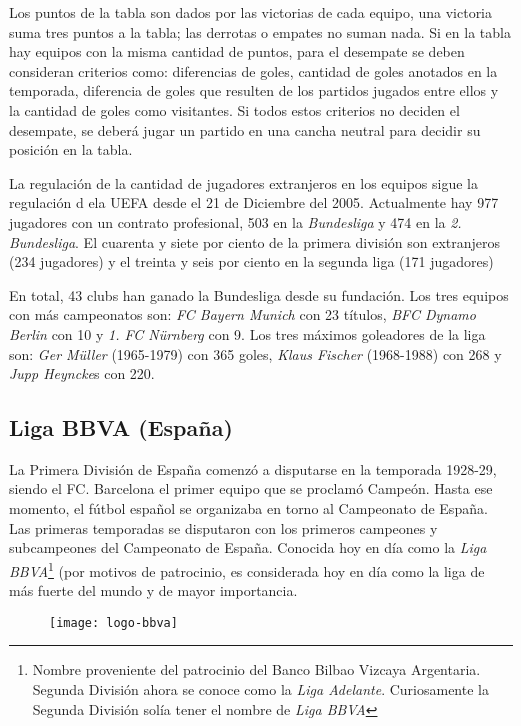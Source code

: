 Los puntos de la tabla son dados por las victorias de cada equipo, una victoria suma tres puntos a la tabla; las derrotas o empates no suman nada. Si en la tabla hay equipos con la misma cantidad de puntos, para el desempate se deben consideran criterios como: diferencias de goles, cantidad de goles anotados en la temporada,  diferencia de goles que resulten de los partidos jugados entre ellos y la cantidad de goles como visitantes. Si todos estos criterios no deciden el desempate, se deberá jugar un partido en una cancha neutral para decidir su posición en la tabla.

La regulación de la cantidad de jugadores extranjeros en los equipos sigue la regulación d ela UEFA desde el 21 de Diciembre del 2005. Actualmente hay 977 jugadores con un contrato profesional, 503 en la \emph{Bundesliga} y 474 en la \emph{2. Bundesliga}. El cuarenta y siete por ciento de la primera división son extranjeros (234 jugadores) y el treinta y seis por ciento  en la segunda liga (171 jugadores)

En total, 43 clubs han ganado la Bundesliga desde su fundación. Los tres equipos con más campeonatos son: \emph{FC Bayern Munich} con 23 títulos, \emph{BFC Dynamo Berlin} con 10 y \emph{1. FC Nürnberg} con 9. Los tres máximos goleadores de la liga son: \emph{Ger Müller} (1965-1979) con 365 goles, \emph{Klaus Fischer} (1968-1988) con 268 y \emph{Jupp Heyncke}s con 220.\cite{bundesliga}

\subsection{Liga BBVA (España)}

La Primera División de España comenzó a disputarse en la temporada 1928-29, siendo el FC. Barcelona el primer equipo que se proclamó Campeón. Hasta ese momento, el fútbol español se organizaba en torno al Campeonato de España. Las primeras temporadas se disputaron con los primeros campeones y subcampeones del Campeonato de España. Conocida hoy en día como la \emph{Liga BBVA}\footnote{Nombre proveniente del patrocinio del Banco Bilbao Vizcaya Argentaria. Segunda División ahora se conoce como la \emph{Liga Adelante}. Curiosamente la Segunda División solía tener el nombre de \emph{Liga BBVA} } (por motivos de patrocinio, es considerada hoy en día como la liga de más fuerte del mundo y de mayor importancia.\cite{strongest-league}

\begin{figure}[!htb]\centering
   \begin {minipage}{0.5\textwidth}
     \texttt{[image: logo-bbva]}
   \end{minipage}
\end{figure}

